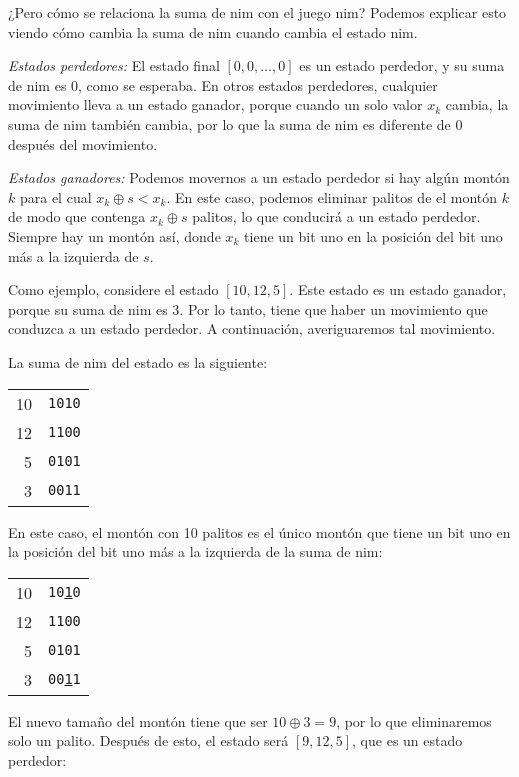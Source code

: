 ¿Pero cómo se relaciona la suma de nim con el juego nim?
Podemos explicar esto viendo cómo cambia la suma de nim
cuando cambia el estado nim.

\textit{Estados perdedores:}
El estado final $[0,0,\ldots,0]$ es un estado perdedor,
y su suma de nim es 0, como se esperaba.
En otros estados perdedores, cualquier movimiento lleva a
un estado ganador, porque cuando un solo valor $x_k$ cambia,
la suma de nim también cambia, por lo que la suma de nim
es diferente de 0 después del movimiento.

\textit{Estados ganadores:}
Podemos movernos a un estado perdedor si
hay algún montón $k$ para el cual $x_k \oplus s < x_k$.
En este caso, podemos eliminar palitos de
el montón $k$ de modo que contenga $x_k \oplus s$ palitos,
lo que conducirá a un estado perdedor.
Siempre hay un montón así, donde $x_k$
tiene un bit uno en la posición del bit uno más a la izquierda
de $s$.

Como ejemplo, considere el estado $[10,12,5]$.
Este estado es un estado ganador,
porque su suma de nim es 3.
Por lo tanto, tiene que haber un movimiento que
conduzca a un estado perdedor.
A continuación, averiguaremos tal movimiento.

La suma de nim del estado es la siguiente:

\begin{center}
\begin{tabular}{r|r}
10 & \texttt{1010} \\
12 & \texttt{1100} \\
5 & \texttt{0101} \\
\hline
3 & \texttt{0011} \\
\end{tabular}
\end{center}

En este caso, el montón con 10 palitos
es el único montón que tiene un bit uno
en la posición del bit uno más a la izquierda
de la suma de nim:

\begin{center}
\begin{tabular}{r|r}
10 & \texttt{10\underline{1}0} \\
12 & \texttt{1100} \\
5 & \texttt{0101} \\
\hline
3 & \texttt{00\underline{1}1} \\
\end{tabular}
\end{center}

El nuevo tamaño del montón tiene que ser
$10 \oplus 3 = 9$,
por lo que eliminaremos solo un palito.
Después de esto, el estado será $[9,12,5]$,
que es un estado perdedor:


